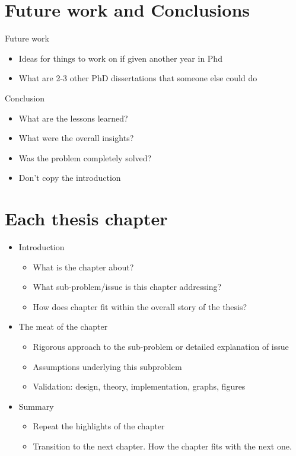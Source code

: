 \section{Future work and Conclusions}

Future work
\begin{itemize}
    \item Ideas for things to work on if given another year in Phd
    \item What are 2-3 other PhD dissertations that someone else could do
\end{itemize}

Conclusion
\begin{itemize}
    \item What are the lessons learned?
    \item What were the overall insights?
    \item Was the problem completely solved? 
    \item Don't copy the introduction
\end{itemize}

\section{Each thesis chapter}
\begin{itemize}
    \item Introduction
        \begin{itemize}
            \item What is the chapter about?
            \item What sub-problem/issue is this chapter addressing?
            \item How does chapter fit within the overall story of the thesis?
        \end{itemize}
    \item The meat of the chapter
        \begin{itemize}
            \item Rigorous approach to the sub-problem or detailed explanation of issue
            \item Assumptions underlying this subproblem
            \item Validation: design, theory, implementation, graphs, figures
        \end{itemize}

    \item Summary
        \begin{itemize}
            \item Repeat the highlights of the chapter
            \item Transition to the next chapter. 
                How the chapter fits with the next one.
        \end{itemize}
\end{itemize}

